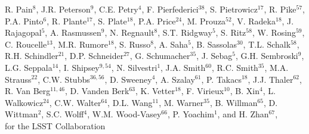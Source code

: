 {R. Pain$^{8}$,
J.R. Peterson$^{9}$,
C.E. Petry$^{4}$,  
F. Pierfederici$^{38}$,
S. Pietrowicz$^{17}$,
R. Pike$^{57}$,
P.A. Pinto$^{6}$,   
R. Plante$^{17}$,
S. Plate$^{18}$, 
P.A. Price$^{24}$,
M. Prouza$^{52}$,
V. Radeka$^{18}$, 
J. Rajagopal$^5$,   
A. Rasmussen$^9$,
N. Regnault$^8$,  
S.T. Ridgway$^5$, 
S. Ritz$^{58}$, 
W. Rosing$^{59}$,
C. Roucelle$^{13}$, 
M.R. Rumore$^{18}$, 
S. Russo$^8$,  
A. Saha$^{5}$,     
B. Sassolas$^{30}$, 
T.L. Schalk$^{58}$,     
R.H. Schindler$^{21}$,
D.P. Schneider$^{27}$,    
G. Schumacher$^{35}$,
J. Sebag$^5$,
G.H. Sembroski$^9$, 
L.G. Seppala$^{14}$,
I. Shipsey$^{9,54}$,
N. Silvestri$^1$,
J.A. Smith$^{60}$,    
R.C. Smith$^{35}$,
M.A. Strauss$^{22}$,     
C.W. Stubbs$^{36,56}$,
D. Sweeney$^4$,
A. Szalay$^{61}$,
P. Takacs$^{18}$, 
J.J. Thaler$^{62}$,
R. Van Berg$^{11,46}$, 
D. Vanden Berk$^{63}$,  
K. Vetter$^{18}$, 
F. Virieux$^{10}$, 
B. Xin$^4$,
L. Walkowicz$^{24}$,
C.W. Walter$^{64}$, 
D.L. Wang$^{11}$,
M. Warner$^{35}$,
B. Willman$^{65}$,
D. Wittman$^2$,
S.C. Wolff$^4$, 
W.M. Wood-Vasey$^{66}$,  
P. Yoachim$^1$,
and H. Zhan$^{67}$, \\
for the LSST Collaboration
}
\affil{}

